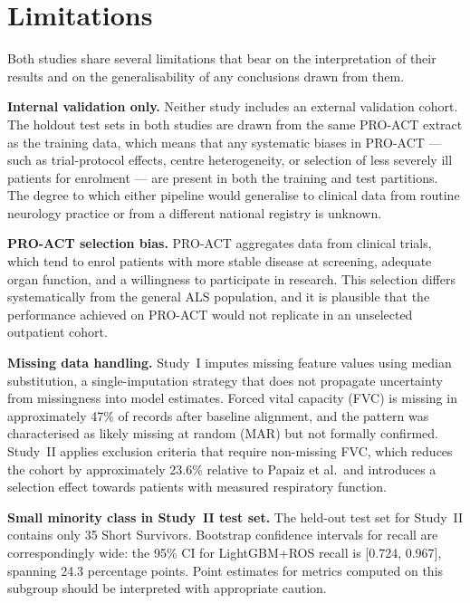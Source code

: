 \section{Limitations}
\label{sec:conclusion_limitations}

Both studies share several limitations that bear on the interpretation of their results and on the generalisability of any conclusions drawn from them.

\textbf{Internal validation only.} Neither study includes an external validation cohort. The holdout test sets in both studies are drawn from the same \gls{PRO-ACT} extract as the training data, which means that any systematic biases in \gls{PRO-ACT} --- such as trial-protocol effects, centre heterogeneity, or selection of less severely ill patients for enrolment --- are present in both the training and test partitions. The degree to which either pipeline would generalise to clinical data from routine neurology practice or from a different national registry is unknown.

\textbf{PRO-ACT selection bias.} \gls{PRO-ACT} aggregates data from clinical trials, which tend to enrol patients with more stable disease at screening, adequate organ function, and a willingness to participate in research. This selection differs systematically from the general ALS population, and it is plausible that the performance achieved on \gls{PRO-ACT} would not replicate in an unselected outpatient cohort.

\textbf{Missing data handling.} Study~I imputes missing feature values using median substitution, a single-imputation strategy that does not propagate uncertainty from missingness into model estimates. Forced vital capacity (\gls{FVC}) is missing in approximately 47\% of records after baseline alignment, and the pattern was characterised as likely missing at random (\gls{MAR}) but not formally confirmed. Study~II applies exclusion criteria that require non-missing \gls{FVC}, which reduces the cohort by approximately 23.6\% relative to Papaiz et al.\ and introduces a selection effect towards patients with measured respiratory function.

\textbf{Small minority class in Study~II test set.} The held-out test set for Study~II contains only 35 Short Survivors. Bootstrap confidence intervals for recall are correspondingly wide: the 95\% \gls{CI} for LightGBM+ROS recall is [0.724, 0.967], spanning 24.3 percentage points. Point estimates for metrics computed on this subgroup should be interpreted with appropriate caution.

